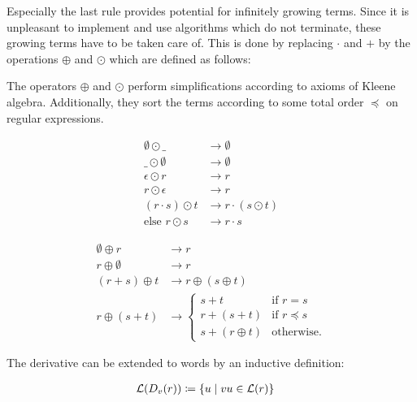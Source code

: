 Especially the last rule provides potential for infinitely growing terms.
Since it is unpleasant to implement and use algorithms which do not terminate,
these growing terms have to be taken care of.
This is done by replacing $\cdot$ and $+$ by the operations $\oplus$ and $\odot$
which are defined as follows:

\begin{definition}
    The operators $\oplus$ and $\odot$ perform simplifications according to axioms of Kleene algebra.
    Additionally, they sort the terms according to some total order $\preceq$ on regular expressions.

    \begin{align}
        \emptyset \odot \_     &\rightarrow \emptyset \\
        \_ \odot \emptyset     &\rightarrow \emptyset \\
        \epsilon \odot r       &\rightarrow r \\
        r \odot \epsilon       &\rightarrow r \\
        (r \cdot s) \odot t    &\rightarrow r \cdot (s \odot t) \\
        \text{else } r \odot s &\rightarrow r \cdot s
    \end{align}

    \begin{align}
        \emptyset \oplus r &\rightarrow r \\
        r \oplus \emptyset &\rightarrow r \\
        (r + s) \oplus t   &\rightarrow r \oplus (s \oplus t) \\
        r \oplus (s + t)   &\rightarrow
        \begin{cases}
            s + t            & \text{if } r = s \\
            r + (s + t)      & \text{if } r \preceq s \\
            s + (r \oplus t) & \text{otherwise}.
        \end{cases}
    \end{align}
\end{definition}

\begin{definition}
    The derivative can be extended to words by an inductive definition:

    \begin{align}
        \label{def:derivative_wrt_words}
        \mathcal{L}(D_v(r)) &\coloneqq \{ u \mid v u \in \mathcal{L}(r) \}
    \end{align}
\end{definition}

